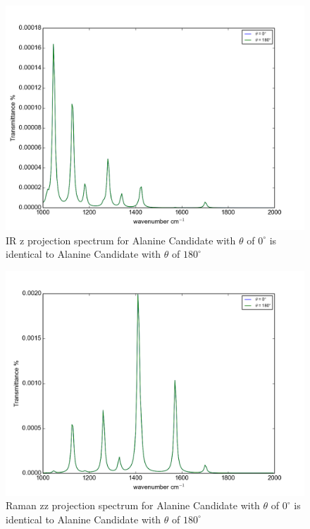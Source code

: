 \begin{figure}[!ht] 
\centering
\includegraphics[scale=0.7]{Figures/Ala_candidates_plotting_ir_z_2.png}
\caption{IR z projection spectrum for Alanine Candidate with $\theta$ of $0^{\circ}$ is identical to Alanine Candidate with $\theta$ of $180^{\circ}$} \label{fig:5.7}
\end{figure}

\begin{figure}[!ht] 
\centering
\includegraphics[scale=0.7]{Figures/Ala_candidates_plotting_raman_zz_2.png}
\caption{Raman zz projection spectrum for Alanine Candidate with $\theta$ of $0^{\circ}$ is identical to Alanine Candidate with $\theta$ of $180^{\circ}$} \label{fig:5.8}
\end{figure}

